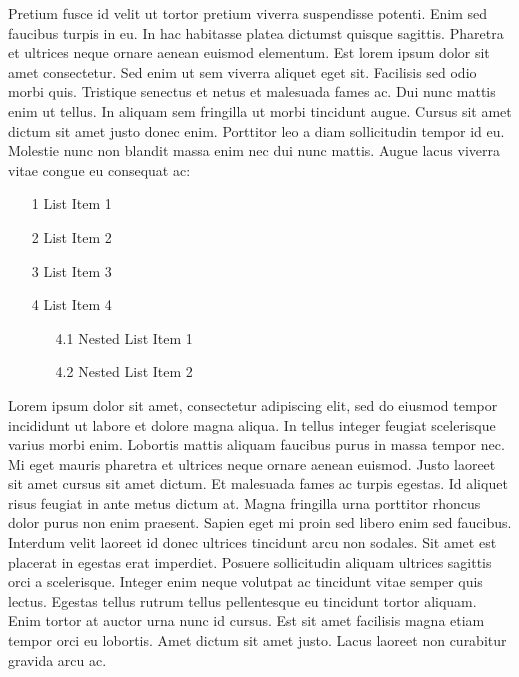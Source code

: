 \documentclass{ledger}
\begin{document}
Pretium fusce id velit ut tortor pretium viverra suspendisse potenti. Enim sed faucibus turpis in eu. In hac habitasse platea dictumst quisque sagittis. Pharetra et ultrices neque ornare aenean euismod elementum. Est lorem ipsum dolor sit amet consectetur. Sed enim ut sem viverra aliquet eget sit. Facilisis sed odio morbi quis. Tristique senectus et netus et malesuada fames ac. Dui nunc mattis enim ut tellus. In aliquam sem fringilla ut morbi tincidunt augue. Cursus sit amet dictum sit amet justo donec enim. Porttitor leo a diam sollicitudin tempor id eu. Molestie nunc non blandit massa enim nec dui nunc mattis. Augue lacus viverra vitae congue eu consequat ac: 
\begin{itemize}
       \item[1] List Item 1
       \item[2] List Item 2
       \item[3] List Item 3
       \item[4] List Item 4
           \begin{itemize}
           \item[4.1] Nested List Item 1
           \item[4.2] Nested List Item 2
           \end{itemize}
\end{itemize}
Lorem ipsum dolor sit amet, consectetur adipiscing elit, sed do eiusmod tempor incididunt ut labore et dolore magna aliqua. In tellus integer feugiat scelerisque varius morbi enim. Lobortis mattis aliquam faucibus purus in massa tempor nec. Mi eget mauris pharetra et ultrices neque ornare aenean euismod. Justo laoreet sit amet cursus sit amet dictum. Et malesuada fames ac turpis egestas. Id aliquet risus feugiat in ante metus dictum at. Magna fringilla urna porttitor rhoncus dolor purus non enim praesent. Sapien eget mi proin sed libero enim sed faucibus. Interdum velit laoreet id donec ultrices tincidunt arcu non sodales. Sit amet est placerat in egestas erat imperdiet. Posuere sollicitudin aliquam ultrices sagittis orci a scelerisque. Integer enim neque volutpat ac tincidunt vitae semper quis lectus. Egestas tellus rutrum tellus pellentesque eu tincidunt tortor aliquam. Enim tortor at auctor urna nunc id cursus. Est sit amet facilisis magna etiam tempor orci eu lobortis. Amet dictum sit amet justo. Lacus laoreet non curabitur gravida arcu ac.
\end{document}
